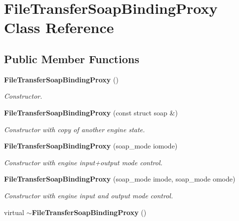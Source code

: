 \section{FileTransferSoapBindingProxy Class Reference}
\label{classFileTransferSoapBindingProxy}
\subsection*{Public Member Functions}
\begin{DoxyCompactItemize}
\item 
{\bf FileTransferSoapBindingProxy} ()\label{classFileTransferSoapBindingProxy_aca393829334a168ce236cba823fcc020}

\begin{DoxyCompactList}\small\item\em Constructor. \item\end{DoxyCompactList}\item 
{\bf FileTransferSoapBindingProxy} (const struct soap \&)\label{classFileTransferSoapBindingProxy_acd4c77d2cce6e66cd458895728b9614f}

\begin{DoxyCompactList}\small\item\em Constructor with copy of another engine state. \item\end{DoxyCompactList}\item 
{\bf FileTransferSoapBindingProxy} (soap\_\-mode iomode)\label{classFileTransferSoapBindingProxy_a2882dfc1cf48cf251227a5bd6331855c}

\begin{DoxyCompactList}\small\item\em Constructor with engine input+output mode control. \item\end{DoxyCompactList}\item 
{\bf FileTransferSoapBindingProxy} (soap\_\-mode imode, soap\_\-mode omode)\label{classFileTransferSoapBindingProxy_a28b0b3aebf1c1941913fd6f037967617}

\begin{DoxyCompactList}\small\item\em Constructor with engine input and output mode control. \item\end{DoxyCompactList}\item 
virtual {\bf $\sim$FileTransferSoapBindingProxy} ()\label{classFileTransferSoapBindingProxy_acd5dd13a11ceafa7b16971f45a1e0ac2}


\end{DoxyCompactItemize}

